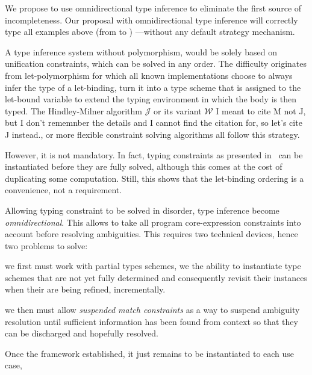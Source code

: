 \documentclass[acmsmall,screen,nonacm]{acmart}
\begin{document}
We propose to use omnidirectional type inference to eliminate the first
source of incompleteness.  Our proposal with omnidirectional type inference
will correctly type all examples above (from  to
)\ignorespaces
{}
---without any default strategy mechanism.

A type inference system without polymorphism, would be solely based on
unification constraints, which can be solved in any order.  The difficulty
originates from \ML let-polymorphism for which all known implementations
choose to always infer the type of a let-binding, turn it into a type scheme
that is assigned to the let-bound variable to extend the typing environment
in which the body is then typed. The
Hindley-Milner algorithm $\mathcal{J}$ or its variant $\mathcal{W}$\Xdidier
{I meant to cite M not J, but I don't rememnber the details and  I 
cannot find the citation for, so let's cite J instead.}, 
or more flexible constraint solving algorithms all follow this strategy.

However, it is not mandatory.  In fact, typing constraints as presented
in~\cite {Pottier-Remy/emlti} can be instantiated before they are fully
solved, although this comes at the cost of duplicating some computation.
Still, this shows that the let-binding ordering is a convenience, not a
requirement.

Allowing typing constraint to be solved in disorder, type inference become
\emph{omnidirectional}.  This allows to take all program core-expression
constraints into account before resolving ambiguities.  This requires two
technical devices, hence two problems to solve:
\begin{enumerate*}
\item
  we first must work with partial types schemes, \ie we the ability
  to instantiate type schemes that are not yet fully determined and
  consequently revisit their instances when their are being refined,
  incrementally.
\item
  we then must allow \emph{suspended match constraints} as a way to suspend
  ambiguity resolution until sufficient information has been found from
  context so that they can be discharged and hopefully resolved.

\end{enumerate*}
Once the framework established, it just remains to be instantiated
to each use case,
\end{document}
